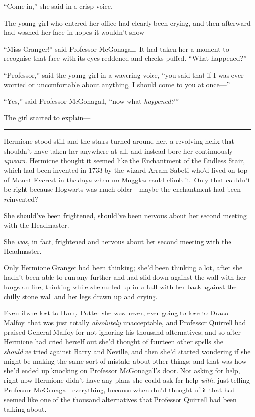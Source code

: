 ``Come in,'' she said in a crisp voice.

The young girl who entered her office had clearly been crying, and then
afterward had washed her face in hopes it wouldn't show---

``Miss Granger!'' said Professor McGonagall. It had taken her a moment
to recognise that face with its eyes reddened and cheeks puffed. ``What
happened?''

``Professor,'' said the young girl in a wavering voice, ``you said that
if I was ever worried or uncomfortable about anything, I should come to
you at once---''

``Yes,'' said Professor McGonagall, ``now what \emph{happened?''}

The girl started to explain---

\begin{center}\rule{3in}{0.4pt}\end{center}

Hermione stood still and the stairs turned around her, a revolving helix
that shouldn't have taken her anywhere at all, and instead bore her
continuously \emph{upward.} Hermione thought it seemed like the
Enchantment of the Endless Stair, which had been invented in 1733 by the
wizard Arram Sabeti who'd lived on top of Mount Everest in the days when
no Muggles could climb it. Only that couldn't be right because Hogwarts
was much older---maybe the enchantment had been \emph{re}invented?

She should've been frightened, should've been nervous about her second
meeting with the Headmaster.

She \emph{was}, in fact, frightened and nervous about her second meeting
with the Headmaster.

Only Hermione Granger had been thinking; she'd been thinking a lot,
after she hadn't been able to run any further and had slid down against
the wall with her lungs on fire, thinking while she curled up in a ball
with her back against the chilly stone wall and her legs drawn up and
crying.

Even if she lost to Harry Potter she was never, ever going to lose to
Draco Malfoy, that was just totally \emph{absolutely} unacceptable, and
Professor Quirrell had praised General Malfoy for not ignoring his
thousand alternatives; and so after Hermione had cried herself out she'd
thought of fourteen other spells she \emph{should've} tried against
Harry and Neville, and then she'd started wondering if she might be
making the same sort of mistake about other things; and that was how
she'd ended up knocking on Professor McGonagall's door. Not asking for
help, right now Hermione didn't have any plans she could ask for help
\emph{with,} just telling Professor McGonagall everything, because when
she'd thought of it that had seemed like one of the thousand
alternatives that Professor Quirrell had been talking about.

